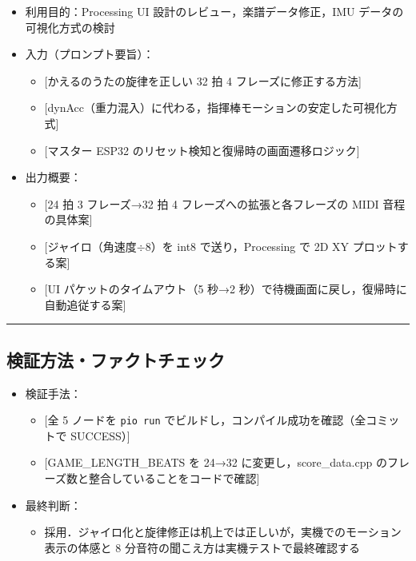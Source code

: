 \documentclass[uplatex,dvipdfmx,a4paper,11pt]{jsarticle}
\newcommand{\sectionrule}{\par\medskip\noindent\rule{\linewidth}{0.6pt}\par\medskip}
\begin{document}
\begin{itemize}
  \item 利用目的：Processing UI 設計のレビュー，楽譜データ修正，IMU データの可視化方式の検討
  \item 入力（プロンプト要旨）：
    \begin{itemize}
      \item {}[かえるのうたの旋律を正しい 32 拍 4 フレーズに修正する方法]
      \item {}[dynAcc（重力混入）に代わる，指揮棒モーションの安定した可視化方式]
      \item {}[マスター ESP32 のリセット検知と復帰時の画面遷移ロジック]
    \end{itemize}
  \item 出力概要：
    \begin{itemize}
      \item {}[24 拍 3 フレーズ→32 拍 4 フレーズへの拡張と各フレーズの MIDI 音程の具体案]
      \item {}[ジャイロ（角速度$\div$8）を int8 で送り，Processing で 2D XY プロットする案]
      \item {}[UI パケットのタイムアウト（5 秒→2 秒）で待機画面に戻し，復帰時に自動追従する案]
    \end{itemize}
\end{itemize}

\sectionrule

\subsection{検証方法・ファクトチェック}

\begin{itemize}
  \item 検証手法：
    \begin{itemize}
      \item {}[全 5 ノードを \texttt{pio run} でビルドし，コンパイル成功を確認（全コミットで SUCCESS）]
      \item {}[GAME\_LENGTH\_BEATS を 24→32 に変更し，score\_data.cpp のフレーズ数と整合していることをコードで確認]
    \end{itemize}
  \item 最終判断：
    \begin{itemize}
      \item 採用．ジャイロ化と旋律修正は机上では正しいが，実機でのモーション表示の体感と
            8 分音符の聞こえ方は実機テストで最終確認する
    \end{itemize}
\end{itemize}
\end{document}

